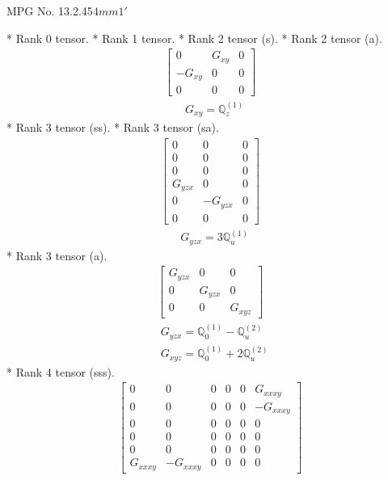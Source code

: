 \documentclass[fleqn,8pt,landscape]{jsarticle}
\begin{document}
\setcounter{MaxMatrixCols}{32}

\renewcommand{\tablename}{Table~}
\renewcommand{\figurename}{Figure~}
\begin{center}
\LARGE
MPG No. 13.2.45\quad$4mm1'$
\end{center}
* Rank 0 tensor.
* Rank 1 tensor.
* Rank 2 tensor (s).
* Rank 2 tensor (a).
\begin{align*}
\begin{bmatrix} 0 & G_{xy} & 0 \\ - G_{xy} & 0 & 0 \\ 0 & 0 & 0 \end{bmatrix}
\end{align*}
\begin{align*}
& G_{xy} = \mathbb{Q}_{z}^{(1)}
\end{align*}
* Rank 3 tensor (ss).
* Rank 3 tensor (sa).
\begin{align*}
\begin{bmatrix} 0 & 0 & 0 \\ 0 & 0 & 0 \\ 0 & 0 & 0 \\ G_{yzx} & 0 & 0 \\ 0 & - G_{yzx} & 0 \\ 0 & 0 & 0 \end{bmatrix}
\end{align*}
\begin{align*}
& G_{yzx} = 3 \mathbb{Q}_{u}^{(1)}
\end{align*}
* Rank 3 tensor (a).
\begin{align*}
\begin{bmatrix} G_{yzx} & 0 & 0 \\ 0 & G_{yzx} & 0 \\ 0 & 0 & G_{xyz} \end{bmatrix}
\end{align*}
\begin{align*}
& G_{yzx} = \mathbb{Q}_{0}^{(1)} - \mathbb{Q}_{u}^{(2)} \\
& G_{xyz} = \mathbb{Q}_{0}^{(1)} + 2 \mathbb{Q}_{u}^{(2)}
\end{align*}
* Rank 4 tensor (sss).
\begin{align*}
\begin{bmatrix} 0 & 0 & 0 & 0 & 0 & G_{xxxy} \\ 0 & 0 & 0 & 0 & 0 & - G_{xxxy} \\ 0 & 0 & 0 & 0 & 0 & 0 \\ 0 & 0 & 0 & 0 & 0 & 0 \\ 0 & 0 & 0 & 0 & 0 & 0 \\ G_{xxxy} & - G_{xxxy} & 0 & 0 & 0 & 0 \end{bmatrix}
\end{align*}
\end{document}
